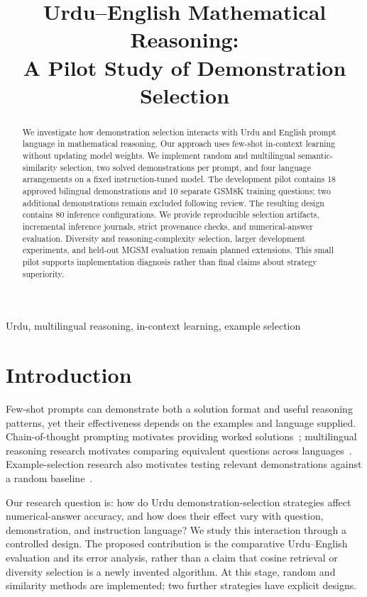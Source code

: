 \documentclass[conference]{IEEEtran}
\title{Urdu--English Mathematical Reasoning:\\A Pilot Study of Demonstration Selection}
\author{\IEEEauthorblockN{Ammar Anees, Hussain Baqar, Rayyan Hasib, and Saad ur Rehman}}
\begin{document}
\maketitle
\begin{abstract}
We investigate how demonstration selection interacts with Urdu and English prompt language in mathematical reasoning. Our approach uses few-shot in-context learning without updating model weights. We implement random and multilingual semantic-similarity selection, two solved demonstrations per prompt, and four language arrangements on a fixed instruction-tuned model. The development pilot contains 18 approved bilingual demonstrations and 10 separate GSM8K training questions; two additional demonstrations remain excluded following review. The resulting design contains 80 inference configurations. We provide reproducible selection artifacts, incremental inference journals, strict provenance checks, and numerical-answer evaluation.  Diversity and reasoning-complexity selection, larger development experiments, and held-out MGSM evaluation remain planned extensions. This small pilot supports implementation diagnosis rather than final claims about strategy superiority.
\end{abstract}
\begin{IEEEkeywords}
Urdu, multilingual reasoning, in-context learning, example selection
\end{IEEEkeywords}

\section{Introduction}
Few-shot prompts can demonstrate both a solution format and useful reasoning patterns, yet their effectiveness depends on the examples and language supplied. Chain-of-thought prompting motivates providing worked solutions~\cite{wei}; multilingual reasoning research motivates comparing equivalent questions across languages~\cite{shi}. Example-selection research also motivates testing relevant demonstrations against a random baseline~\cite{liu}.

Our research question is: how do Urdu demonstration-selection strategies affect numerical-answer accuracy, and how does their effect vary with question, demonstration, and instruction language? We study this interaction through a controlled design. The proposed contribution is the comparative Urdu--English evaluation and its error analysis, rather than a claim that cosine retrieval or diversity selection is a newly invented algorithm. At this stage, random and similarity methods are implemented; two further strategies have explicit designs.
\end{document}
